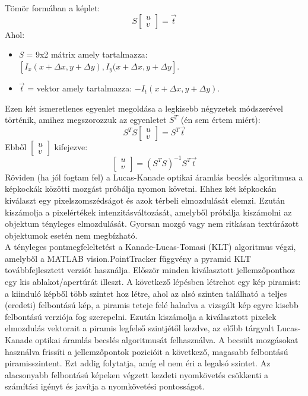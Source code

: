 \documentclass[12pt]{report}
\begin{document}
\begin{enumerate}
                    Tömör formában a képlet:
                    \[S\begin{bmatrix} u \\ v \end{bmatrix} = \overset{\rightarrow}{t}\]
                    Ahol:
                    \begin{itemize}
                        \item \textit{S} = 9x2 mátrix amely tartalmazza: $[I_x(x + \Delta x, y + \Delta y),  I_y(x + \Delta x, y + \Delta y]$.
                        \item \textit{$\overset{\rightarrow}{t}$} = vektor amely tartalmazza: $-I_t(x + \Delta x, y + \Delta y)$.
                    \end{itemize}
                    Ezen két ismeretlenes egyenlet megoldása a legkisebb négyzetek módszerével történik, amihez megszorozzuk az egyenletet $S^{T}$ (én sem értem miért):
                    \[S^{T}S\begin{bmatrix}u \\ v\end{bmatrix} = S^{T}\overset{\rightarrow}{t}\]
                    Ebből $\begin{bmatrix}u \\ v\end{bmatrix}$ kifejezve:
                    \[\begin{bmatrix}u \\ v\end{bmatrix} = (S^{T}S)^{-1}S^{T}\overset{\rightarrow}{t}\]
                Röviden (ha jól fogtam fel) a Lucas-Kanade optikai áramlás becslés algoritmusa a képkockák közötti mozgást próbálja nyomon követni. Ehhez két képkockán kiválaszt egy pixelszomszédságot és azok térbeli elmozdulását elemzi. Ezután kiszámolja a pixelértékek intenzitásváltozását, amelyből próbálja kiszámolni az objektum tényleges elmozdulását. Gyorsan mozgó vagy nem ritkásan textúrázott objektumok esetén nem megbízható.\\
                A tényleges pontmegfeleltetést a Kanade-Lucas-Tomasi (KLT) algoritmus végzi, amelyből a MATLAB vision.PointTracker függvény a pyramid KLT továbbfejlesztett verziót használja. Először minden kiválasztott jellemzőponthoz egy kis ablakot/apertúrát illeszt. A következő lépésben létrehot egy kép piramist: a kiinduló képből több szintet hoz létre, ahol az alsó szinten található a teljes (eredeti) felbontású kép, a piramis teteje felé haladva a vizsgált kép egyre kisebb felbontású verziója fog szerepelni. Ezután kiszámolja a kiválasztott pixelek elmozdulás vektorait a piramis legfelső szintjétől kezdve, az előbb tárgyalt Lucas-Kanade optikai áramlás becslés algoritmusát felhasználva. A becsült mozgásokat használva frissíti a jellemzőpontok pozicióit a következő, magasabb felbontású piramisszintent. Ezt addig folytatja, amíg el nem éri a legalsó szintet. Az alacsonyabb felbontású képeken végzett kezdeti nyomkövetés csökkenti a számítási igényt és javítja a nyomkövetési pontosságot. 
                \end{enumerate}
\end{document}
